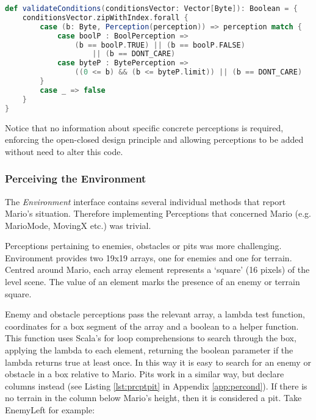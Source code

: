 \begin{minipage}{0.9\linewidth}
\centering
\begin{lstlisting}[language=scala]
def validateConditions(conditionsVector: Vector[Byte]): Boolean = {
    conditionsVector.zipWithIndex.forall {
        case (b: Byte, Perception(perception)) => perception match {
            case boolP : BoolPerception => 
                (b == boolP.TRUE) || (b == boolP.FALSE) 
                    || (b == DONT_CARE)
            case byteP : BytePerception => 
                ((0 <= b) && (b <= byteP.limit)) || (b == DONT_CARE)
        }
        case _ => false 
    }
}

\end{lstlisting}
\end{minipage}

Notice that no information about specific concrete perceptions is required, enforcing the open-closed design principle and allowing perceptions to be added without need to alter this code.

\subsubsection{Perceiving the Environment}

The \emph{Environment} interface contains several individual methods that report Mario's situation. Therefore implementing Perceptions that concerned Mario (e.g. MarioMode, MovingX etc.) was trivial.

Perceptions pertaining to enemies, obstacles or pits was more challenging. Environment provides two 19x19 arrays, one for enemies and one for terrain. Centred around Mario, each array element represents a `square' (16 pixels) of the level scene. The value of an element marks the presence of an enemy or terrain square. 

Enemy and obstacle perceptions pass the relevant array, a lambda test function, coordinates for a box segment of the array and a boolean to a helper function. This function uses Scala's for loop comprehensions to search through the box, applying the lambda to each element, returning the boolean parameter if the lambda returns true at least once. In this way it is easy to search for an enemy or obstacle in a box relative to Mario. Pits work in a similar way, but declare columns instead (see Listing \ref{lst:prcptpit} in Appendix \ref{app:percond}). If there is no terrain in the column below Mario's height, then it is considered a pit. Take EnemyLeft for example:

